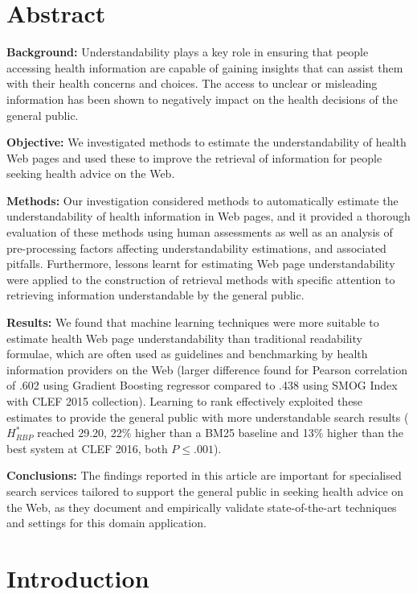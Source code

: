 \documentclass[10pt,a4paper]{article}
\begin{document}
	
\section*{Abstract}
\textbf{Background:} Understandability plays a key role in ensuring that people accessing health information are capable of gaining insights that can assist them with their health concerns and choices. The access to unclear or misleading information has been shown to negatively impact on the health decisions of the general public.

\textbf{Objective:} We investigated methods to estimate the understandability of health Web pages and used these to improve the retrieval of information for people seeking health advice on the Web.

\textbf{Methods:} Our investigation considered methods to automatically estimate the understandability of health information in Web pages, and it provided a thorough evaluation of these methods using human assessments as well as an analysis of pre-processing factors affecting understandability estimations, and associated pitfalls. Furthermore, lessons learnt for estimating Web page understandability were applied to the construction of retrieval methods with specific attention to retrieving information understandable by the general public.

\textbf{Results:} We found that machine learning techniques were more suitable to estimate health Web page understandability than traditional readability formulae, which are often used as guidelines and benchmarking by health information providers on the Web (larger difference found for Pearson correlation of .602 using Gradient Boosting regressor compared to .438 using SMOG Index with CLEF 2015 collection). 
Learning to rank effectively exploited these estimates to provide the general public with more understandable search results ($H^*_{RBP}$ reached 29.20, 22\% higher than a BM25 baseline and 13\% higher than the best system at CLEF 2016, both $P \le .001$).

\textbf{Conclusions:} The findings reported in this article are important for specialised search services tailored to support the general public in seeking health advice on the Web, as they document and empirically validate state-of-the-art techniques and settings for this domain application.


\section*{Introduction} 
\label{chp:understanding_understandability}
\end{document}
